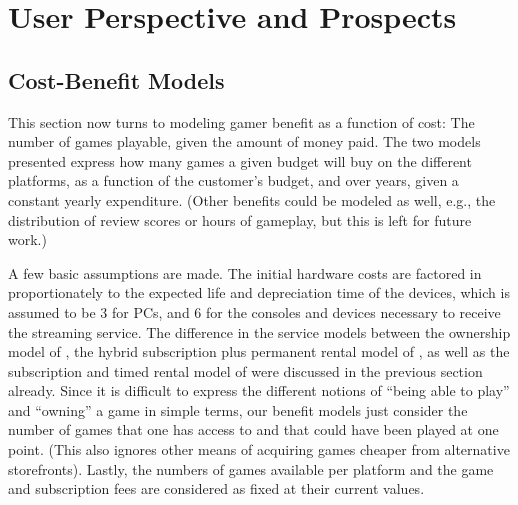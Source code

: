 \section{User Perspective and Prospects}
\label{sec:engagement}

\subsection{Cost-Benefit Models}\label{subsec:cost-benefit-models}

This section now turns to modeling gamer benefit as a function of cost: The number of games playable, given the amount of money paid. The two models presented express how many games a given budget will buy on the different platforms, as a function of the customer's budget, and over years, given a constant yearly expenditure. (Other benefits could be modeled as well, e.g., the distribution of review scores or hours of gameplay, but this is left for future work.)

A few basic assumptions are made. The initial hardware costs are factored in proportionately to the expected life and depreciation time of the devices, which is assumed to be \SI{3}{\year} for PCs, and \SI{6}{\year} for the consoles and devices necessary to receive the streaming service. %
The difference in the service models between the ownership model of \steam, the hybrid subscription plus permanent rental model of \gfnow, as well as the subscription and timed rental model of \psnow were discussed in the previous section already. Since it is difficult to express the different notions of ``being able to play'' and ``owning'' a game in simple terms, our benefit models just consider the number of games that one has access to and that could have been played at one point. (This also ignores other means of acquiring games cheaper from alternative storefronts).
Lastly, the numbers of games available per platform and the game and subscription fees are considered as fixed at their current values.


